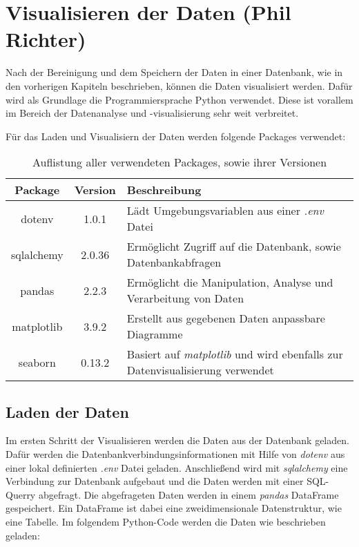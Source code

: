 \chapter{Visualisieren der Daten (Phil Richter)}
Nach der Bereinigung und dem Speichern der Daten in einer Datenbank, wie in den vorherigen Kapiteln beschrieben, können die Daten visualisiert werden. Dafür wird als Grundlage
die Programmiersprache Python verwendet. Diese ist vorallem im Bereich der Datenanalyse und -visualisierung sehr weit verbreitet.

Für das Laden und Visualisiern der Daten werden folgende Packages verwendet:
\begin{table}[h!]
    \centering
    \begin{tabularx}{\textwidth}{|c|c|>{\centering\arraybackslash}X|}
        \hline
        \textbf{Package} & \textbf{Version} & \textbf{Beschreibung} \\ \hline
        dotenv & 1.0.1 & Lädt Umgebungsvariablen aus einer \textit{.env} Datei \\ \hline
        sqlalchemy & 2.0.36 & Ermöglicht Zugriff auf die Datenbank, sowie Datenbankabfragen \\ \hline
        pandas & 2.2.3 & Ermöglicht die Manipulation, Analyse und Verarbeitung von Daten \\ \hline
        matplotlib & 3.9.2 & Erstellt aus gegebenen Daten anpassbare Diagramme \\ \hline
        seaborn & 0.13.2 & Basiert auf \textit{matplotlib} und wird ebenfalls zur Datenvisualisierung verwendet \\ \hline
    \end{tabularx}
    \caption{Auflistung aller verwendeten Packages, sowie ihrer Versionen}
\end{table}

\section{Laden der Daten}\label{sec:laden}
Im ersten Schritt der Visualisieren werden die Daten aus der Datenbank geladen. Dafür werden die Datenbankverbindungsinformationen mit Hilfe von \textit{dotenv}
aus einer lokal definierten \textit{.env} Datei geladen. Anschließend wird mit \textit{sqlalchemy} eine Verbindung zur Datenbank aufgebaut und die Daten werden 
mit einer SQL-Querry abgefragt. Die abgefrageten Daten werden in einem \textit{pandas} DataFrame gespeichert. Ein DataFrame ist dabei eine zweidimensionale Datenstruktur,
wie eine Tabelle. Im folgendem Python-Code werden die Daten wie beschrieben geladen:


